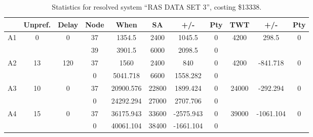 \begin{sidewaystable}
\footnotesize
\caption{Statistics for resolved system ``RAS DATA SET 3'', costing \$13338.}
\centering
\begin{tabular}{c||c|c||c|c|c|c|c||c|c|c}
  \hline \hline
  &
  Unpref. & 
  Delay &
  Node &
  When &
  SA &
  +/- &
  Pty &
  TWT &
  +/- &
  Pty \\
      \hline
      \multirow{2}{*}{A1} &
      \multirow{2}{*}{0} &
      \multirow{2}{*}{0} &
      37 &
      1354.5 &
      2400 &
        1045.5 &
        0 &
      \multirow{2}{*}{4200} &
        \multirow{2}{*}{298.5} &
        \multirow{2}{*}{0}
      \\
      \cline{4-8}
       &
       &
       &
      39 &
      3901.5 &
      6000 &
        2098.5 &
        0 &
      
         &
        
      \\
      \hline
      \multirow{2}{*}{A2} &
      \multirow{2}{*}{13} &
      \multirow{2}{*}{120} &
      37 &
      1560 &
      2400 &
        840 &
        0 &
      \multirow{2}{*}{4200} &
        \multirow{2}{*}{-841.718} &
        \multirow{2}{*}{0}
      \\
      \cline{4-8}
       &
       &
       &
      0 &
      5041.718 &
      6600 &
        1558.282 &
        0 &
      
         &
        
      \\
      \hline
      \multirow{2}{*}{A3} &
      \multirow{2}{*}{10} &
      \multirow{2}{*}{0} &
      37 &
      20900.576 &
      22800 &
        1899.424 &
        0 &
      \multirow{2}{*}{24000} &
        \multirow{2}{*}{-292.294} &
        \multirow{2}{*}{0}
      \\
      \cline{4-8}
       &
       &
       &
      0 &
      24292.294 &
      27000 &
        2707.706 &
        0 &
      
         &
        
      \\
      \hline
      \multirow{2}{*}{A4} &
      \multirow{2}{*}{15} &
      \multirow{2}{*}{0} &
      37 &
      36175.943 &
      33600 &
        -2575.943 &
        0 &
      \multirow{2}{*}{39000} &
        \multirow{2}{*}{-1061.104} &
        \multirow{2}{*}{0}
      \\
      \cline{4-8}
       &
       &
       &
      0 &
      40061.104 &
      38400 &
        -1661.104 &
        0 &
      

\end{tabular}
\end{sidewaystable}
